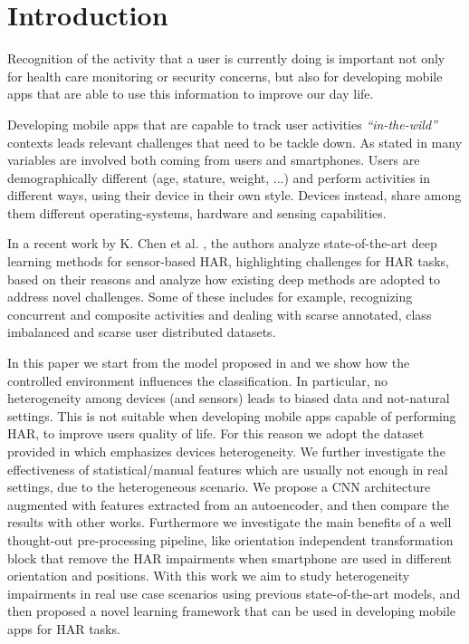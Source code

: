 
\section{Introduction}
\label{sec:introduction}

Recognition of the activity that a user is currently doing is
important not only for health care monitoring or security concerns,
but also for developing mobile apps that are able to use this
information to improve our day life.

Developing mobile apps that are capable to track user activities \textit{``in-the-wild''} contexts leads relevant challenges that need to be tackle
down. As stated in \cite{blunck2013heterogeneity} many variables are
involved both coming from users and smartphones. Users are
demographically different (age, stature, weight, ...) and perform
activities in different ways, using their device in their own
style. Devices instead, share among them different operating-systems,
hardware and sensing capabilities.

In a recent work by K. Chen et al. \cite{chen2020deep}, the authors analyze state-of-the-art
deep learning methods for sensor-based HAR, highlighting challenges for HAR tasks, based on their reasons and analyze how existing deep
methods are adopted to address novel challenges. Some of these
includes for example, recognizing concurrent and composite activities
and dealing with scarse annotated, class imbalanced and scarse user
distributed datasets.

In this paper we start from the model proposed in \cite{ignatov2018real} 
and we show how the controlled environment influences the classification.
In particular, no heterogeneity among devices (and sensors) leads to biased data and
not-natural settings. This is not suitable when developing mobile apps
capable of performing HAR, to improve users quality of life. For this reason we adopt the dataset provided
in \cite{stisen2015smart} which emphasizes devices heterogeneity.
We further investigate the
effectiveness of statistical/manual features which are usually not
enough in real settings, due to the heterogeneous scenario. 
We propose a CNN architecture augmented with features extracted from an
autoencoder, and then compare the results with other
works. Furthermore we investigate the main benefits of a well thought-out
pre-processing pipeline, like orientation independent transformation
block that remove the HAR impairments when smartphone are used in
different orientation and positions. With this work we aim to study
heterogeneity impairments in real use case scenarios using previous
state-of-the-art models, and then proposed a novel learning framework
that can be used in developing mobile apps for HAR tasks.

